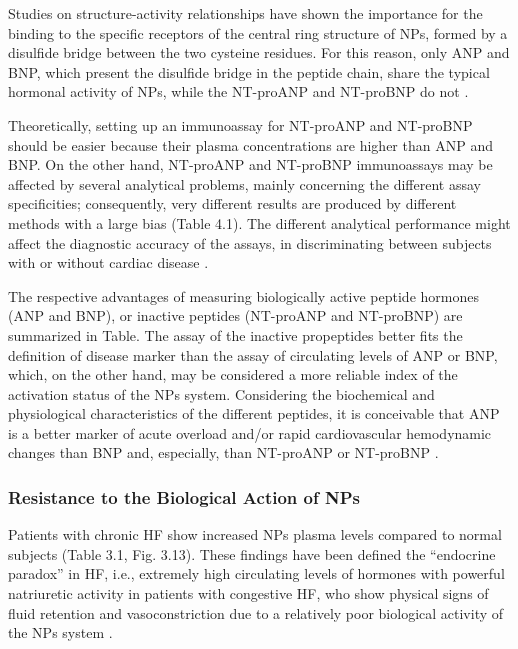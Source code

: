 \documentclass[14pt,a4paper,onecolumn]{extarticle}
\begin{document}
Studies on structure-activity relationships have shown the importance for the binding to the specific receptors of the central ring structure of NPs, formed by a disulfide bridge between the two cysteine  residues. For this reason, only ANP and BNP, which present the disulfide bridge in the peptide chain, share the typical hormonal activity of NPs, while the NT-proANP and NT-proBNP do not \citep{bib35} \citep{bib36} \citep{bib37}.



Theoretically, setting up an immunoassay for NT-proANP and NT-proBNP should be easier because their plasma concentrations are higher than ANP and BNP.  On the other hand, NT-proANP and NT-proBNP immunoassays may be affected by several analytical problems, mainly concerning the different assay specificities; consequently, very different results are produced by different methods with a large bias (Table 4.1). The different analytical performance might affect the diagnostic accuracy of the assays, in discriminating between subjects with or without cardiac disease \citep{bib32} \citep{bib35} \citep{bib36}.



The respective advantages of measuring biologically active peptide hormones (ANP and BNP), or inactive peptides (NT-proANP and NT-proBNP) are summarized in Table. The assay of the inactive propeptides better fits the definition of disease marker than the assay of circulating levels of ANP or BNP, which, on the other hand, may be considered a more reliable index of the activation status of the NPs system. Considering the biochemical and physiological characteristics of the different peptides, it is conceivable that ANP is a better marker of acute overload and/or rapid cardiovascular hemodynamic changes than BNP and, especially, than NT-proANP or NT-proBNP \citep{bib32} \citep{bib35}.



\subsubsection{ Resistance to the Biological Action of NPs}



Patients with chronic HF show increased NPs plasma levels compared to normal subjects (Table 3.1, Fig. 3.13). These findings have been defined the “endocrine paradox” in HF, i.e., extremely high circulating levels of hormones with powerful natriuretic activity in patients with congestive HF, who show physical signs of fluid retention and vasoconstriction due to a relatively poor biological activity of the NPs system \citep{bib36}.
\end{document}
